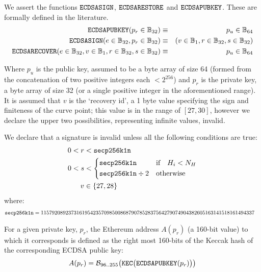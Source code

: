 \documentclass[9pt,oneside]{amsart}
\newcommand{\firsthomesteadblock}{\ensuremath{N_H}}
\begin{document}
We assert the functions $\mathtt{\small ECDSASIGN}$, $\mathtt{\small ECDSARESTORE}$ and $\mathtt{\small ECDSAPUBKEY}$. These are formally defined in the literature.
\begin{eqnarray}
\mathtt{\small ECDSAPUBKEY}(p_r \in \mathbb{B}_{32}) & \equiv & p_u \in \mathbb{B}_{64} \\
\mathtt{\small ECDSASIGN}(e \in \mathbb{B}_{32}, p_r \in \mathbb{B}_{32}) & \equiv & (v \in \mathbb{B}_{1}, r \in \mathbb{B}_{32}, s \in \mathbb{B}_{32}) \\
\mathtt{\small ECDSARECOVER}(e \in \mathbb{B}_{32}, v \in \mathbb{B}_{1}, r \in \mathbb{B}_{32}, s \in \mathbb{B}_{32}) & \equiv & p_u \in \mathbb{B}_{64}
\end{eqnarray}

Where $p_u$ is the public key, assumed to be a byte array of size 64 (formed from the concatenation of two positive integers each $< 2^{256}$) and $p_r$ is the private key, a byte array of size 32 (or a single positive integer in the aforementioned range). It is assumed that $v$ is the `recovery id', a 1 byte value specifying the sign and finiteness of the curve point; this value is in the range of $[27, 30]$, however we declare the upper two possibilities, representing infinite values, invalid.

\newcommand{\slimit}{\ensuremath{\text{s-limit}}}

We declare that a signature is invalid unless all the following conditions are true:
\begin{align}
0 < r &< \mathtt{\tiny secp256k1n} \\
0 < s &< \begin{dcases}
\mathtt{\tiny secp256k1n} & \text{if} \quad H_i < \firsthomesteadblock \\
\mathtt{\tiny secp256k1n} \div 2 & \text{otherwise} \\
\end{dcases} \\
 v &\in \{27,28\}
\end{align}
where:
\begin{align}
\mathtt{\tiny secp256k1n} &= 115792089237316195423570985008687907852837564279074904382605163141518161494337
\end{align}

For a given private key, $p_r$, the Ethereum address $A(p_r)$ (a 160-bit value) to which it corresponds is defined as the right most 160-bits of the Keccak hash of the corresponding ECDSA public key:
\begin{equation}
A(p_r) = \mathcal{B}_{96..255}\big(\mathtt{\tiny KEC}\big( \mathtt{\small ECDSAPUBKEY}(p_r) \big) \big)
\end{equation}
\end{document}
